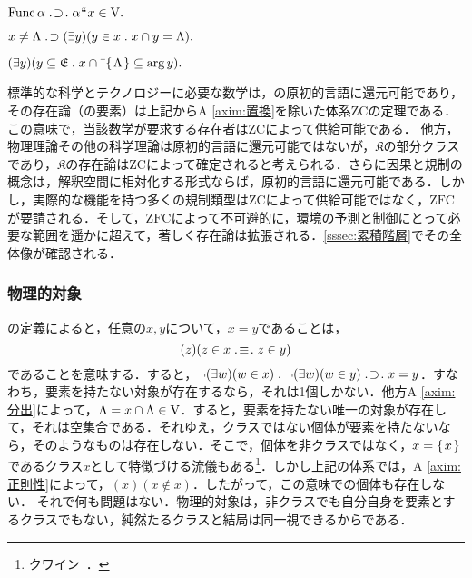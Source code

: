\begin{axim}[置換]
\label{axim:置換}
$
    \func\alpha\case{1}{1}{1}\alpha\img x\in\univ.
$
\end{axim}

\begin{axim}[正則性]
\label{axim:正則性}
$
    x\neq \Lambda {\;.\!}\supset (\exists y)(y\in x{\;.\;}x\cap y=\Lambda).
$
\end{axim}

\begin{axim}[選択]
\label{axim:選択}
$
    (\exists y)(
        y\subseteq\mathfrak{E}\con{1}x\cap\barl{\classab{\Lambda}}\subseteq\arg y
    ).
$
\end{axim}

\noindent 標準的な科学とテクノロジーに必要な数学は，の原初的言語に還元可能であり，その存在論（の要素）は上記からA \ref{axim:置換}を除いた体系$\mathrm{ZC}$の定理である．この意味で，当該数学が要求する存在者は$\mathrm{ZC}$によって供給可能である．
他方，物理理論その他の科学理論は原初的言語に還元可能ではないが，$\mathfrak{K}$の部分クラスであり，$\mathfrak{K}$の存在論は$\mathrm{ZC}$によって確定されると考えられる．さらに因果と規制の概念は，解釈空間に相対化する形式ならば，原初的言語に還元可能である．しかし，実際的な機能を持つ多くの規制類型は$\mathrm{ZC}$によって供給可能ではなく，$\mathrm{ZFC}$が要請される．そして，$\mathrm{ZFC}$によって不可避的に，環境の予測と制御にとって必要な範囲を遥かに超えて，著しく存在論は拡張される．\ref{sssec:累積階層}でその全体像が確認される．

\subsubsection{物理的対象}
\label{sssec:物理的対象}

の定義によると，任意の$ x,y $について，$ x = y $であることは，
\[
    (z)(z\in x\case{3}{1}{1}z\in y)
\]
であることを意味する．すると，$ \neg(\exists w)(w\in x)\con{1}\neg(\exists w)(w\in y)\case{1}{1}{1}x = y $．すなわち，要素を持たない対象が存在するなら，それは1個しかない．他方A \ref{axim:分出}によって，$ \Lambda = x\cap\Lambda\in\mathrm{V} $．すると，要素を持たない唯一の対象が存在して，それは空集合である．それゆえ，クラスではない個体が要素を持たないなら，そのようなものは存在しない．そこで，個体を非クラスではなく，$ x = \{\mspace{2mu}x\mspace{2mu}\} $であるクラス$ x $として特徴づける流儀もある\footnote{
    クワイン~\cite[p.\,29]{クワインa}．
}．しかし上記の体系では，A \ref{axim:正則性}によって，$ (x)(x\notin x) $．したがって，この意味での個体も存在しない．
それで何も問題はない．物理的対象は，非クラスでも自分自身を要素とするクラスでもない，純然たるクラスと結局は同一視できるからである．

